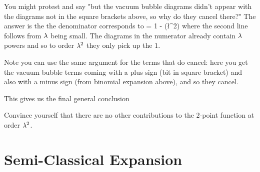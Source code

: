 You might protest and say "but the vacuum bubble diagrams didn't appear with the diagrams not in the square brackets above, so why do they cancel there?" The answer is the the denominator corresponds to 
\bse 
     = 1 - \cO(\l^2)
\ese 
where the second line follows from $\lambda$ being small. The diagrams in the numerator already contain $\lambda$ powers and so to order $\lambda^2$ they only pick up the $1$. 

\br 
    Note you can use the same argument for the terms that do cancel: here you get the vacuum bubble terms coming with a plus sign (bit in square bracket) and also with a minus sign (from binomial expansion above), and so they cancel. 
\er 

This gives us the final general conclusion 

\bbox 
    Convince yourself that there are no other contributions to the $2$-point function at order $\lambda^2$. 
\ebox 

\section{Semi-Classical Expansion}

